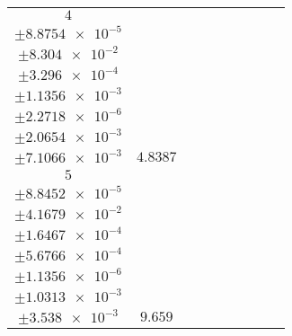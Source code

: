 \documentclass[8pt]{article}
\begin{document}
\begin{longtable}[l]{c c c c c c c c c}
$\num{4}$ & \begin{tabular}[c]{@{}c@{}}$\num{6.1488e-2}$ \\ $\pm\num{8.8754e-5}$\end{tabular} & \begin{tabular}[c]{@{}c@{}}$\num{0.18593}$ \\ $\pm\num{8.304e-2}$\end{tabular} & \begin{tabular}[c]{@{}c@{}}$\num{12.903}$ \\ $\pm\num{3.296e-4}$\end{tabular} & \begin{tabular}[c]{@{}c@{}}$\num{1.3473e+3}$ \\ $\pm\num{1.1356e-3}$\end{tabular} & \begin{tabular}[c]{@{}c@{}}$\num{2.6954}$ \\ $\pm\num{2.2718e-6}$\end{tabular} & \begin{tabular}[c]{@{}c@{}}$\num{1.1793}$ \\ $\pm\num{2.0654e-3}$\end{tabular} & \begin{tabular}[c]{@{}c@{}}$\num{4.25}$ \\ $\pm\num{7.1066e-3}$\end{tabular} & $\num{4.8387}$\\
$\num{5}$ & \begin{tabular}[c]{@{}c@{}}$\num{0.12229}$ \\ $\pm\num{8.8452e-5}$\end{tabular} & \begin{tabular}[c]{@{}c@{}}$\num{-0.35689}$ \\ $\pm\num{4.1679e-2}$\end{tabular} & \begin{tabular}[c]{@{}c@{}}$\num{-7.3992}$ \\ $\pm\num{1.6467e-4}$\end{tabular} & \begin{tabular}[c]{@{}c@{}}$\num{1.3647e+3}$ \\ $\pm\num{5.6766e-4}$\end{tabular} & \begin{tabular}[c]{@{}c@{}}$\num{2.7302}$ \\ $\pm\num{1.1356e-6}$\end{tabular} & \begin{tabular}[c]{@{}c@{}}$\num{1.1748}$ \\ $\pm\num{1.0313e-3}$\end{tabular} & \begin{tabular}[c]{@{}c@{}}$\num{4.2312}$ \\ $\pm\num{3.538e-3}$\end{tabular} & $\num{9.659}$\\

\end{longtable}
\end{document}
